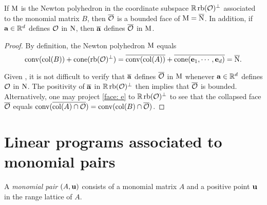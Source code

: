 \documentclass[11pt]{amsart}
\begin{document}
%


\begin{lemma}
\label{collapse of Newton polyhedron: L} 
If $\mathrm{M}$ is the Newton polyhedron in the coordinate subspace $\mathbb{R} \operatorname{rb}(\mathcal{O})^{\perp}$ associated to the monomial matrix $B$, then $\overline{\mathcal{O}}$ is a bounded face of $\mathrm{M} = \overline{\mathrm{N}}$.    In addition, if $\mathbf{a} \in \mathbb{R}^d$ defines $\mathcal{O}$ in $\mathrm{N}$, then $ \overline{\mathbf{a}}$ defines $\overline{\mathcal{O}}$ in $\mathrm{M}$. 
\end{lemma}

\begin{proof}
By definition, the Newton polyhedron $\mathrm{M}$ equals
%
\[  \operatorname{conv}( \operatorname{col}(B) ) + \operatorname{cone}(\operatorname{rb}(\mathcal{O})^{\perp}) =  \overline{\operatorname{conv}( \operatorname{col}(A))} + \overline{\operatorname{cone}(\mathbf{e}_1, \cdots, \mathbf{e}_d)} =  \overline{\mathrm{N}}.\]

Given , it is not difficult to verify that $\overline{\mathbf{a}}$ defines $\overline{\mathcal{O}}$ in $\mathrm{M}$ whenever $\mathbf{a} \in \mathbb{R}^d$ defines $\mathcal{O}$ in $\mathrm{N}$.  The positivity of $\overline{\mathbf{a}}$ in $\mathbb{R} \operatorname{rb}(\mathcal{O})^{\perp}$ then implies that $\overline{\mathcal{O}}$ is bounded.  Alternatively, one may project \eqref{face: e} to $\mathbb{R} \operatorname{rb}(\mathcal{O})^{\perp}$ to see that the collapsed face $\overline{\mathcal{O}}$ equals $\operatorname{conv}( \overline{ \operatorname{col}(A) \cap \mathcal{O}}) = \operatorname{conv}( \operatorname{col}(B) \cap \overline{\mathcal{O}})$.  
\end{proof}



\newpage



\section{Linear programs associated to monomial pairs}


\begin{definition}
A \emph{monomial pair} $(A, \mathbf{u})$ consists of a monomial matrix $A$ and a positive point $\mathbf{u}$ in the range lattice of $A$.
\end{definition}
\end{document}
